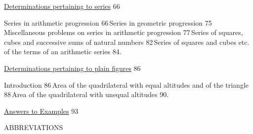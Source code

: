 \documentclass[10pt, openany]{book}
\begin{document}
\noindent \hyperref[ser]{Determinations  pertaining to series} \hfill 66 

\vspace{2mm}
\begin{minipage}{0.8\textwidth} 
 Series in arithmetic progression 66\textemdash \,Series in geometric progression 75\textemdash \,Miscellaneous problems on series in arithmetic progression 77\textemdash \,Series of  squares, cubes and successive sums of natural numbers 82\textemdash \,Series of squares and cubes etc. of the terms of an arithmetic series 84.
  \end{minipage}

\vspace{2mm}

\noindent \hyperref[plane]{Determinations  pertaining to plain figures} \hfill 86 

\vspace{2mm}
\begin{minipage}{0.8\textwidth} 
 Introduction 86\textemdash \,Area of the quadrilateral with equal altitudes and of the triangle 88\textemdash \,Area of the quadrilateral with unequal altitudes 90.
\end{minipage}

\vspace{2mm}

\noindent \hyperref[ans]{Answers to Examples} \hfill 93

\afterpage{\fancyhead[CE]{}}
\afterpage{\fancyhead[CO]{}}
\afterpage{\fancyhead[LE,RO]{}}
\cfoot{}



\newpage

\begin{center}
{\large ABBREVIATIONS}
\end{center}
\vspace{4mm}
\end{document}
